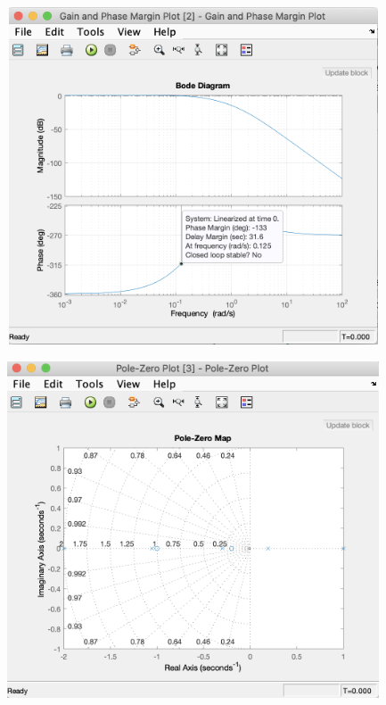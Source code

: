 \documentclass[a4paper,11pt]{article}
\makeatletter
\newcommand{\problemtitle}[1]{\gdef\@problemtitle{#1}}%
\newcommand{\problemquestion}[1]{\gdef\@problemquestion{#1}}%
\newcommand{\problemsolution}[1]{\gdef\@problemsolution{#1}}%
\theoremstyle{mytheor}
\makeatother
\begin{document}
\includegraphics[width=12cm, height=10cm]{bode_plot.png}

\includegraphics[width=12cm, height=10cm]{pole_zero_plot.png}

\begin{problem}
  \problemtitle{Part D}
  \problemquestion{Analyze Bode plot - calculate asymptotes and frequence breaks and put calculations in report. Also calculate intersections of the plot with axes.
}
  \problemsolution{
  Asymptotes were calculated by general function for calculating asymptotes https://lpsa.swarthmore.edu/Bode/BodeHowGen.htmlusing
  Computations were implemented by MATLAB functions (code is below)
  
  Frequence breaks are poles and zeros(roots of numerator and denominator) were calculated using MATLAB.
  
  
  
  }
\end{problem}
\end{document}
